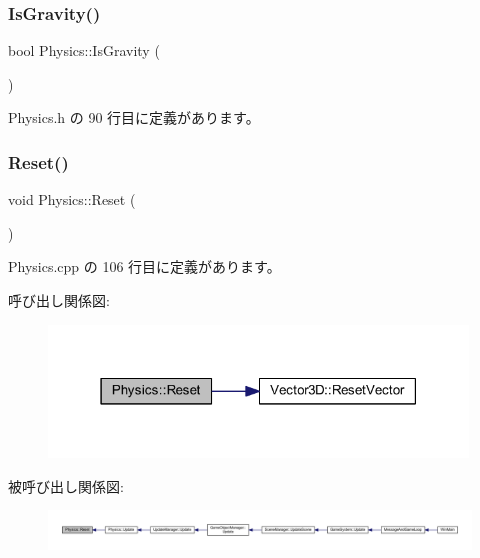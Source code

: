 \subsubsection{\texorpdfstring{Is\+Gravity()}{IsGravity()}}
{\footnotesize\ttfamily bool Physics\+::\+Is\+Gravity (\begin{DoxyParamCaption}{ }\end{DoxyParamCaption})\hspace{0.3cm}{\ttfamily [inline]}}



 Physics.\+h の 90 行目に定義があります。

\mbox{\label{class_physics_a7ba30ff9f5a0a0a12616ed861f68a20f}} 
\subsubsection{\texorpdfstring{Reset()}{Reset()}}
{\footnotesize\ttfamily void Physics\+::\+Reset (\begin{DoxyParamCaption}{ }\end{DoxyParamCaption})\hspace{0.3cm}{\ttfamily [private]}}



 Physics.\+cpp の 106 行目に定義があります。

呼び出し関係図\+:\nopagebreak
\begin{figure}[H]
\begin{center}
\leavevmode
\includegraphics[width=316pt]{class_physics_a7ba30ff9f5a0a0a12616ed861f68a20f_cgraph}
\end{center}
\end{figure}
被呼び出し関係図\+:
\nopagebreak
\begin{figure}[H]
\begin{center}
\leavevmode
\includegraphics[width=350pt]{class_physics_a7ba30ff9f5a0a0a12616ed861f68a20f_icgraph}
\end{center}
\end{figure}
\mbox{\label{class_physics_a6f4c3f73eb1d2669ccc449b0d74f9d32}} 
